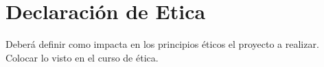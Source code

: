 \chapter{Declaración de Etica}

Deberá definir como impacta en los principios éticos el proyecto a realizar. Colocar lo visto en el curso de ética.

